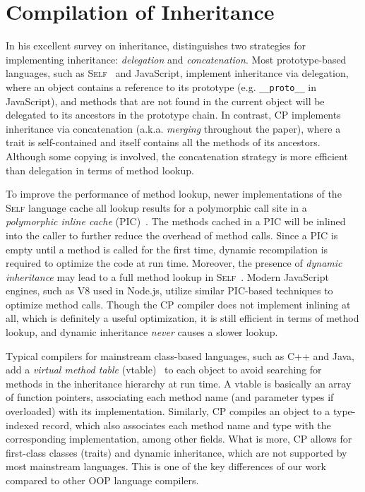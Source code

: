 \section{Compilation of Inheritance}

In his excellent survey on inheritance, \citet{taivalsaari1996notion}
distinguishes two strategies for implementing inheritance: \emph{delegation} and
\emph{concatenation}. Most prototype-based languages, such as
\textsc{Self}~\citep{ungar1987self} and JavaScript, implement inheritance via
delegation, where an object contains a reference to its prototype (e.g.
\lstinline{__proto__} in JavaScript), and methods that are not found in the
current object will be delegated to its ancestors in the prototype chain. In
contrast, CP implements inheritance via concatenation (a.k.a. \emph{merging}
throughout the paper), where a trait is self-contained and itself contains all
the methods of its ancestors. Although some copying is involved, the
concatenation strategy is more efficient than delegation in terms of method
lookup.

To improve the performance of method lookup, newer implementations of the
\textsc{Self} language cache all lookup results for a polymorphic call site in a
\emph{polymorphic inline cache} (PIC)~\citep{holzle1991optimizing}. The methods
cached in a PIC will be inlined into the caller to further reduce the overhead
of method calls. Since a PIC is empty until a method is called for the first
time, dynamic recompilation is required to optimize the code at run time.
Moreover, the presence of \emph{dynamic inheritance} may lead to a full method
lookup in \textsc{Self}~\citep{chambers1992design}. Modern JavaScript engines,
such as V8 used in Node.js, utilize similar PIC-based techniques to optimize
method calls. Though the CP compiler does not implement inlining at all, which
is definitely a useful optimization, it is still efficient in terms of method
lookup, and dynamic inheritance \emph{never} causes a slower lookup.

Typical compilers for mainstream class-based languages, such as C++ and Java,
add a \emph{virtual method table} (vtable)~\citep{driesen1995message} to each
object to avoid searching for methods in the inheritance hierarchy at run time.
A vtable is basically an array of function pointers, associating each method
name (and parameter types if overloaded) with its implementation. Similarly, CP
compiles an object to a type-indexed record, which also associates each method
name and type with the corresponding implementation, among other fields. What is
more, CP allows for first-class classes (traits) and dynamic inheritance, which
are not supported by most mainstream languages. This is one of the key
differences of our work compared to other OOP language compilers.

